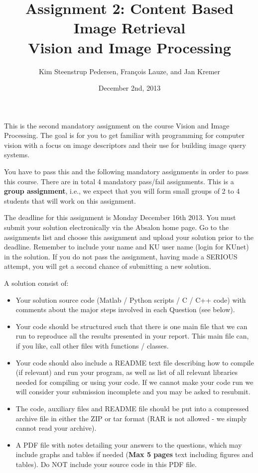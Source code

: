 \documentclass[a4paper,12pts]{article}
\begin{document}
\title{Assignment 2: Content Based Image Retrieval \\
Vision and Image Processing}
\author{Kim Steenstrup Pedersen, Fran\c{c}ois Lauze, and Jan Kremer}
\date{December 2nd, 2013}
\maketitle


\noindent This is the second mandatory assignment on the course Vision
and Image Processing. The goal is for you to get familiar with
programming for computer vision with a focus on image descriptors and
their use for building image query systems.

You have to pass this and the following mandatory assignments in order
to pass this course. There are in total 4 mandatory pass/fail
assignments. This is a \textbf{group assignment}, i.e., we expect that you will
form small groups of 2 to 4 students that will work on this assignment.


The deadline for this assignment is Monday December 16th 2013. You must submit
your solution electronically via the Absalon home page. Go to the
assignments list and choose this assignment and upload your solution
prior to the deadline. Remember to include your name and KU user name
(login for {KU}net) in the solution. If you do not pass the
assignment, having made a SERIOUS attempt, you will get a second
chance of submitting a new solution.

A solution consist of:
\begin{itemize}
\item Your solution source code (Matlab / Python scripts / C / C++
  code) with comments about the major steps involved in each Question
  (see below).
\item Your code should be structured such that there is one main file
  that we can run to reproduce all the results presented in your
  report. This main file can, if you like, call other files with
  functions / classes.
\item Your code should also include a README text file describing how
  to compile (if relevant) and run your program, as well as list of
  all relevant libraries needed for compiling or using your code. If
  we cannot make your code run we will consider your submission
  incomplete and you may be asked to resubmit.
\item The code, auxiliary files and README file should be put into a
  compressed archive file in either the ZIP or tar format (RAR is not
  allowed - we simply cannot read your archive).
\item A PDF file with notes detailing your answers to the questions,
  which may include graphs and tables if needed ({\bf Max 5 pages}
  text including figures and tables). Do NOT include your source code
  in this PDF file.
\end{itemize}
\end{document}
